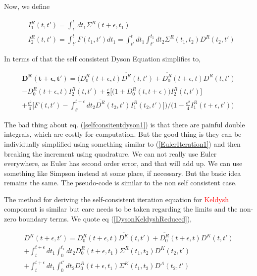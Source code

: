 \documentclass{amsart}
\begin{document}
         {Now, we define}
        
        \begin{align}
            & {I^R_1(t,t')=\int^{t}_{t'} dt_1  \Sigma^R (t+\epsilon,t_1)}\\
            & {I^R_2(t,t')=\int^{t}_{t'}F(t_1,t')dt_1=\int^{t}_{t'}dt_1\int^{t_1}_{t'} dt_2  \Sigma^R (t_1,t_2) D^R(t_2, t')}
        \end{align}
        
         {In terms of that the self consistent Dyson Equation simplifies to,}
        
        \begin{multline}\label{selfconsitentdyson2}
             {\mathbf{D^R(t+\epsilon , t')} = \Bigg(D^R_0(t+\epsilon , t)\overline{D^R}(t , t')+\overline{D^R_0}(t+\epsilon , t)D^R(t , t')}
                        \\  {-D_0^R(t+\epsilon, t)I^R_2(t,t') +\frac{\epsilon}{2} \Big[ \Big(1+\overline{D_0^R}(t,t+\epsilon)\Big)I^R_2(t,t') \Big]}\\  {+\frac{\epsilon^2}{4} 
                        \Big[ F(t,t') -\int^{t+\epsilon}_{t'} dt_2  \overline{D^R}(t_2 ,t')I^R_1(t_2,t')\Big]\Bigg)\Big/\Bigg(1-\frac{\epsilon^2}{4}I^R_1(t+\epsilon,t')\Bigg)}
        \end{multline}
        
    The bad thing about eq. (\ref{selfconsitentdyson1}) is that there are painful double integrals, which are costly for computation. But the good thing is they can be individually simplified using something similar to (\ref{EulerIteration1}) and then breaking the increment using quadrature.
    We can not really use Euler everywhere, as Euler has second order error, and that will add up. We can use something like Simpson instead at some place, if necessary. But the basic idea remains the same.    
    The pseudo-code is similar to the non self consistent case.
    
    
     {The method for deriving the self-consistent iteration equation for \textcolor{Red}{Keldysh} component is similar but care needs to be taken regarding the limits and the non-zero boundary terms. We quote eq (\ref{DysonKeldyshReduced}),}
    
    
    \begin{multline}
         D^K(t+\epsilon , t') = D^R_0(t+\epsilon , t)\overline{D^K}(t , t')+\overline{D^R_0}(t+\epsilon , t)D^K(t , t')
                         \\  + \int^{t+\epsilon}_{t} dt_1\int^{t_1}_{0} dt_2 D_0^R(t+\epsilon, t_1) \Sigma^R (t_1,t_2) D^K(t_2, t')
                         \\  + \int^{t+\epsilon}_{t} dt_1\int^{t'}_{0} dt_2 D_0^R(t+\epsilon, t_1) \Sigma^K (t_1,t_2) D^A(t_2, t')
    \end{multline}
    
\end{document}
